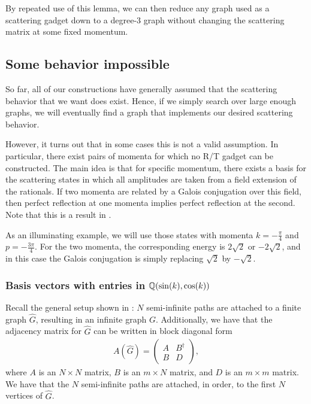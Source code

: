 \documentclass[../thesis-main/thesis-main]{subfiles}
\begin{document}
By repeated use of this lemma, we can then reduce any graph used as a scattering gadget down to a degree-3 graph without changing the scattering matrix at some fixed momentum.



\subsection{Some behavior impossible}

So far, all of our constructions have generally assumed that the scattering behavior that we want does exist.  Hence, if we simply search over large enough graphs, we will eventually find a graph that implements our desired scattering behavior.

However, it turns out that in some cases this is not a valid assumption.  In particular, there exist pairs of momenta for which no R/T gadget can be constructed.  The main idea is that for specific momentum, there exists a basis for the scattering states in which all amplitudes are taken from a field extension of the rationals.  If two momenta are related by a Galois conjugation over this field, then perfect reflection at one momenta implies perfect reflection at the second.  Note that this is a result in \cite{MomSwitches}.

As an illuminating example, we will use those states with momenta $k= -\frac{\pi}{4}$ and $p = - \frac{3\pi}{4}$.  For the two momenta, the corresponding energy is $2 \sqrt{2}$ or $-2\sqrt{2}$, and in this case the Galois conjugation is simply replacing $\sqrt{2}$ by $-\sqrt{2}$. 


\subsubsection{Basis vectors with entries in $\mathbb{Q}(\sin(k),\cos(k))$}
\label{sec:vecs_over_field}

Recall the general setup shown in : $N$ semi-infinite paths are attached to a finite graph $\widehat G$, resulting in an infinite graph $G$.  Additionally, we have that the adjacency matrix for $\widehat{G}$ can be written in block diagonal form
\begin{align}
  A(\widehat{G}) = \begin{pmatrix} 
    A & B^\dag\\
    B & D
  \end{pmatrix},
\end{align}
where $A$ is an $N\times N$ matrix, $B$ is an $m\times N$ matrix, and $D$ is an $m\times m$ matrix.  We have that the $N$ semi-infinite paths are attached, in order, to the first $N$ vertices of $\widehat{G}$.
\end{document}
